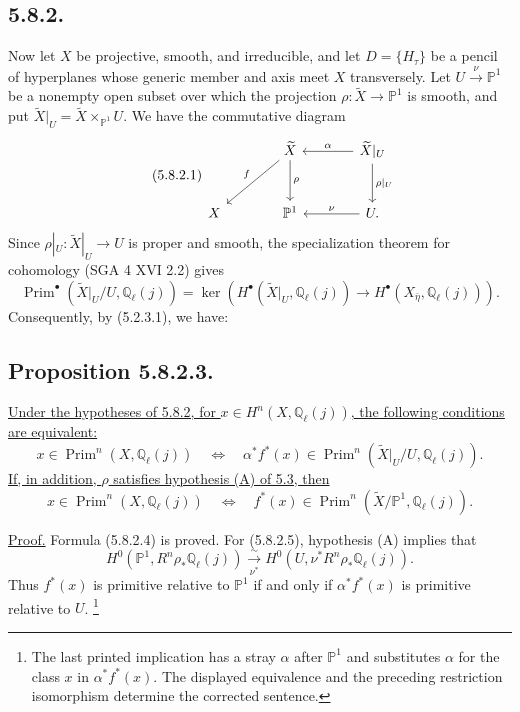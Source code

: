 \subsection*{5.8.2.}
Now let $X$ be projective, smooth, and irreducible, and let
$D=\{H_\tau\}$ be a pencil of hyperplanes whose generic member and axis
meet $X$ transversely.  Let
$U\xrightarrow{\nu}\mathbb P^1$ be a nonempty open subset over which the
projection $\rho:\widetilde X\to\mathbb P^1$ is smooth, and put
$\widetilde X|_U=\widetilde X\times_{\mathbb P^1}U$.  We have the
commutative diagram
\begin{equation}\tag{5.8.2.1}
\begin{tikzcd}[column sep=large,row sep=large]
{}
&
\widetilde X
  \arrow[dl,"f"']
  \arrow[d,"\rho"]
&
\widetilde X|_U
  \arrow[l,"\alpha"']
  \arrow[d,"\rho|_U"]
\\
X
&
\mathbb P^1
&
U\arrow[l,"\nu"'].
\end{tikzcd}
\end{equation}
Since $\rho|_U:\widetilde X|_U\to U$ is proper and smooth, the
specialization theorem for cohomology (SGA 4 XVI 2.2) gives
\begin{equation}\tag{5.8.2.2}
\operatorname{Prim}^\bullet(\widetilde X|_U/U,\mathbb Q_\ell(j))
=\ker\!\left(
H^\bullet(\widetilde X|_U,\mathbb Q_\ell(j))
\longrightarrow H^\bullet(X_{\bar\eta},\mathbb Q_\ell(j))
\right).
\end{equation}
Consequently, by (5.2.3.1), we have:

\subsection*{Proposition 5.8.2.3.}
\underline{Under the hypotheses of 5.8.2, for
$x\in H^n(X,\mathbb Q_\ell(j))$, the following conditions are equivalent:}
\begin{equation}\tag{5.8.2.4}
x\in\operatorname{Prim}^n(X,\mathbb Q_\ell(j))
\quad\Longleftrightarrow\quad
\alpha^*f^*(x)\in
\operatorname{Prim}^n(\widetilde X|_U/U,\mathbb Q_\ell(j)).
\end{equation}
\underline{If, in addition, $\rho$ satisfies hypothesis (A) of 5.3, then}
\begin{equation}\tag{5.8.2.5}
x\in\operatorname{Prim}^n(X,\mathbb Q_\ell(j))
\quad\Longleftrightarrow\quad
f^*(x)\in
\operatorname{Prim}^n(\widetilde X/\mathbb P^1,\mathbb Q_\ell(j)).
\end{equation}

\underline{Proof.}
Formula (5.8.2.4) is proved.  For (5.8.2.5), hypothesis (A) implies that
\[
H^0(\mathbb P^1,R^n\rho_*\mathbb Q_\ell(j))
\xrightarrow[\nu^*]{\sim}
H^0(U,\nu^*R^n\rho_*\mathbb Q_\ell(j)).
\]
Thus $f^*(x)$ is primitive relative to $\mathbb P^1$ if and only if
$\alpha^*f^*(x)$ is primitive relative to $U$.
\footnote{The last printed implication has a stray $\alpha$ after
$\mathbb P^1$ and substitutes $\alpha$ for the class $x$ in
$\alpha^*f^*(x)$.  The displayed equivalence and the preceding restriction
isomorphism determine the corrected sentence.}

